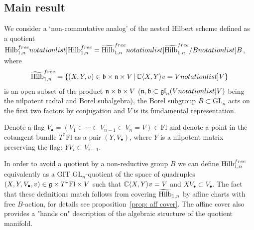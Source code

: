 \documentclass[10pt]{amsart}
\begin{document}



\subsection{Main result}
 We consider a `non-commutative analog' of the nested Hilbert scheme defined as a quotient
  $\SymbolPrint{\Hilb_{1,n}^{free}}=\SymbolPrint{\widetilde{\Hilb}_{1,n}^{free}}/\SymbolPrint{B}$, where
 \[
 \widetilde{\Hilb}_{1,n}^{free} = \{
 (X,Y,v)\in \frb\times\frn\times V\,|\,\CC\langle X,Y\rangle v=\SymbolPrint{V}
 \}
 \]
 is an open subset of the product $\mathfrak{n}\times\mathfrak{b}\times V$ ($\frn,\frb\subset\mathfrak{gl}_n(\SymbolPrint{V})$ being the nilpotent radial and Borel subalgebra), the Borel subgroup $B\subset\mathrm{GL}_n$ acts on the first two factors by conjugation and  $V$ is its fundamental representation.

Denote a flag $ V_\bullet=(V_1\subset\cdots \subset V_{n-1}\subset V_n=V)\in \mathrm{Fl}$ and denote a point in the cotangent bundle $T^*\mathrm{Fl}$ as a pair \( (Y,V_\bullet )\), where $Y$ is a nilpotent matrix preserving the flag: $Y V_i\subset V_{i-1}$.

In order to  avoid a quotient by a non-reductive group \(B\) we can define \(\mathrm{Hilb}^{free}_{1,n}\) equivalently as a GIT \(\mathrm{GL}_n\)-quotient of
%
%
 the space  of quadruples \((X,Y,V_\bullet,v)\in \mathfrak{g}\times T^*\mathrm{Fl}\times V\) such that \(\mathbb{C}\langle X,Y\rangle v=V\) and \(X V_\bullet\subset V_\bullet\).
 The fact that these definitions match follows from covering
  \(\widetilde{\mathrm{Hilb}}_{1,n}\) by affine charts with free \(B\)-action, for details see proposition~\ref{prop: aff cover}. The affine cover also provides a "hands on" description of the algebraic structure of the quotient manifold.
\end{document}
